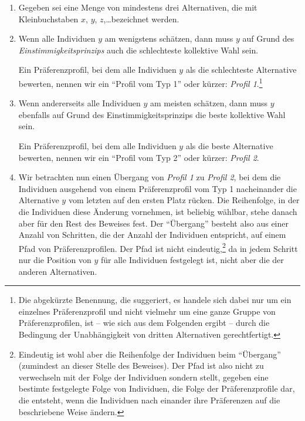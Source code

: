\begin{enumerate}
  \item Gegeben sei eine Menge von mindestens drei Alternativen, die mit
  Kleinbuchstaben $x$, $y$, $z$,\ldots bezeichnet werden.
  
  \item Wenn alle Individuen $y$ am wenigstens schätzen, dann muss
  $y$ auf Grund des {\em Einstimmigkeitsprinzips} auch die schlechteste 
  kollektive Wahl sein.
  
  Ein Präferenzprofil, bei dem alle Individuen $y$ als die schlechteste
  Alternative bewerten, nennen wir ein "`Profil vom Typ 1"' oder kürzer: {\em
  Profil 1}.\footnote{Die abgekürzte Benennung, die suggeriert, es handele sich
  dabei nur um ein einzelnes Präferenzprofil und nicht vielmehr um eine ganze
  Gruppe von Präferenzprofilen, ist -- wie sich aus dem Folgenden ergibt --
  durch die Bedingung der Unabhängigkeit von dritten Alternativen
  gerechtfertigt.}

  \item Wenn andererseits alle Individuen $y$ am meisten schätzen, dann muss $y$
  ebenfalls auf Grund des Einstimmigkeitsprinzips die beste kollektive Wahl sein.
  
  Ein Präferenzprofil, bei dem alle Individuen $y$ als die beste Alternative
  bewerten, nennen wir ein "`Profil vom Typ 2"' oder kürzer: {\em Profil 2}.
  
  \item Wir betrachten nun einen Übergang von {\em Profil 1} zu {\em Profil 2},
  bei dem die Individuen ausgehend von einem Präferenzprofil vom Typ 1
  nacheinander die Alternative $y$ vom letzten auf den ersten Platz rücken. Die
  Reihenfolge, in der die Individuen diese Änderung vornehmen, ist beliebig
  wählbar, stehe danach aber für den Rest des Beweises fest. Der "`Übergang"'
  besteht also aus einer Anzahl von Schritten, die der Anzahl der Individuen
  entspricht, auf einem Pfad von Präferenzprofilen. Der Pfad ist nicht
  eindeutig,\footnote{Eindeutig ist wohl aber die Reihenfolge der Individuen beim
  "`Übergang"' (zumindest an dieser Stelle des Beweises). Der Pfad ist also nicht
  zu verwechseln mit der Folge der Individuen sondern stellt, gegeben eine
  bestimte festgelegte Folge von Individuen, die Folge der Präferenzprofile dar,
  die entsteht, wenn die Individuen nach einander ihre Präferenzen auf die
  beschriebene Weise ändern.} da in jedem Schritt nur die Position von $y$ für
  alle Individuen festgelegt ist, nicht aber die der anderen Alternativen.
 

\end{enumerate}
